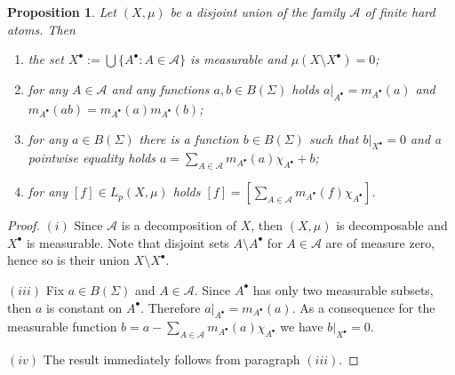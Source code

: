 \documentclass[12pt]{article}
\newtheorem{proposition}[theorem]{Proposition}
\begin{document}
\begin{proposition}\label{HardAtomicMeasProp} Let $(X,\mu)$ be a disjoint union
    of the family $\mathcal{A}$ of finite hard atoms. Then
    \begin{enumerate}[label = (\roman*)]
        \item the set $X^\bullet:=\bigcup \{A^\bullet:A\in\mathcal{A}\}$ is
              measurable and $\mu(X\setminus X^\bullet)=0$;

        \item for any $A\in\mathcal{A}$ and any functions $a,b\in B(\Sigma)$
              holds $a|_{A^\bullet}=m_{A^\bullet}(a)$ and
              $m_{A^\bullet}(ab)=m_{A^\bullet}(a)m_{A^\bullet}(b)$;

        \item for any $a\in B(\Sigma)$ there is a function $b\in B(\Sigma)$ such
              that $b|_{X^\bullet}=0$ and a pointwise equality holds
              $a=\sum_{A\in\mathcal{A}} m_{A^\bullet}(a)\chi_{A^\bullet} + b$;

        \item for any $[f]\in L_p(X,\mu)$ holds $[f]=[\sum_{A\in\mathcal{A}}
                  m_{A^\bullet}(f)\chi_{A^\bullet}]$.
    \end{enumerate}
\end{proposition}
\begin{proof} $(i)$ Since $\mathcal{A}$ is a decomposition of $X$, then
    $(X,\mu)$ is decomposable and $X^\bullet$ is measurable. Note that disjoint
    sets $A\setminus A^\bullet$ for $A\in\mathcal{A}$ are of measure zero, hence
    so is their union $X\setminus X^\bullet$.

    $(iii)$ Fix $a\in B(\Sigma)$ and $A\in \mathcal{A}$. Since $A^\bullet$ has
    only two measurable subsets, then $a$ is constant on $A^\bullet$. Therefore
    $a|_{A^\bullet}=m_{A^\bullet}(a)$. As a consequence for the measurable
    function $b=a-\sum_{A\in\mathcal{A}}m_{A^\bullet}(a)\chi_{A^\bullet}$ we
    have $b|_{X^\bullet}=0$.

    $(iv)$ The result immediately follows from paragraph $(iii)$.
\end{proof}
\end{document}
